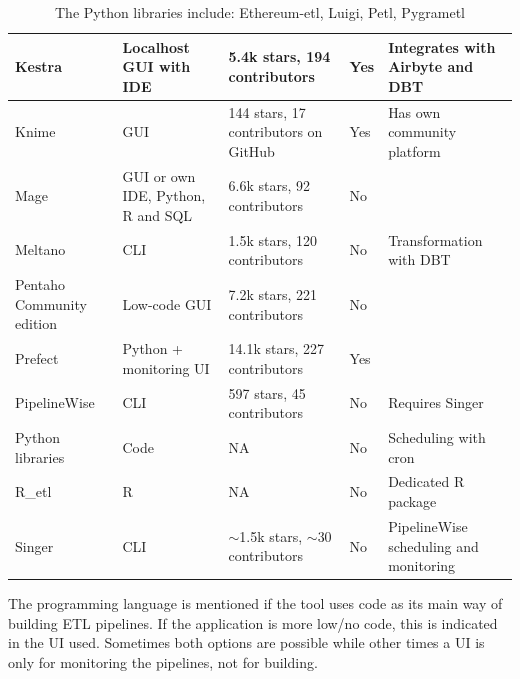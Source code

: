 \documentclass[11pt]{article}
\begin{document}
\begin{table}[H]
\begin{tabular}[c]{|p{2cm}|p{4cm}|p{4cm}|p{1.5cm}|p{4cm}|}
    Kestra & Localhost GUI with IDE & 5.4k stars, 194 contributors & Yes & Integrates with Airbyte and DBT \\ \hline
    Knime & GUI & 144 stars, 17 contributors on GitHub & Yes & Has own community platform \\ \hline
    Mage & GUI or own IDE, Python, R and SQL & 6.6k stars, 92 contributors & No &  \\ \hline
    Meltano & CLI & 1.5k stars, 120 contributors & No & Transformation with DBT \\ \hline
    Pentaho Community edition & Low-code GUI & 7.2k stars, 221 contributors & No &  \\ \hline
    Prefect & Python + monitoring UI & 14.1k stars, 227 contributors & Yes &  \\ \hline
    PipelineWise & CLI & 597 stars, 45 contributors & No & Requires Singer \\ \hline
    Python libraries\text{*} & Code & NA & No & Scheduling with cron \\ \hline
    R\_etl & R & NA & No & Dedicated R package \\ \hline
    Singer & CLI & $\sim$1.5k stars, $\sim$30 contributors & No & PipelineWise scheduling and monitoring \\ \hline
    \end{tabular}
    \caption{\text{*}The Python libraries include: Ethereum-etl, Luigi, Petl, Pygrametl}
\end{table}

The programming language is mentioned if the tool uses code as its main way of building ETL pipelines. If the application is more low/no code, this is indicated in the UI used. Sometimes both options are possible while other times a UI is only for monitoring the pipelines, not for building.
\end{document}
